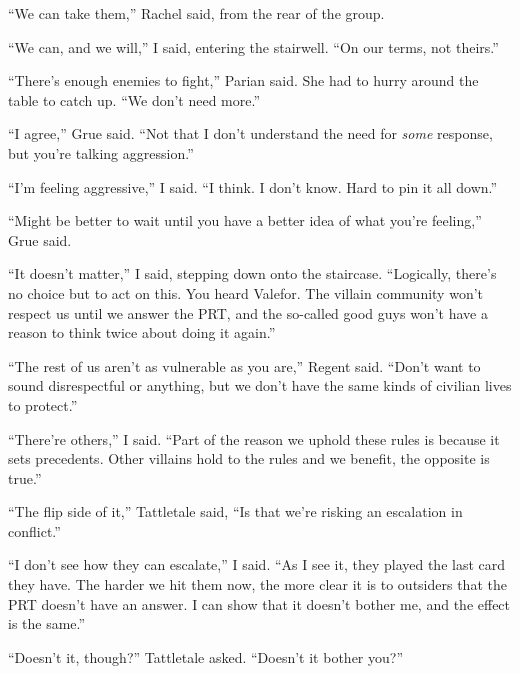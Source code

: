 ``We can take them,'' Rachel said, from the rear of the group.



``We can, and we will,'' I said, entering the stairwell.  ``On our terms, not theirs.''



``There's enough enemies to fight,'' Parian said.  She had to hurry around the table to catch up.  ``We don't need more.''



``I agree,'' Grue said.  ``Not that I don't understand the need for \emph{some }response, but you're talking aggression.''



``I'm feeling aggressive,'' I said.  ``I think.  I don't know.  Hard to pin it all down.''



``Might be better to wait until you have a better idea of what you're feeling,'' Grue said.



``It doesn't matter,'' I said, stepping down onto the staircase.  ``Logically, there's no choice but to act on this.  You heard Valefor.  The villain community won't respect us until we answer the PRT, and the so-called good guys won't have a reason to think twice about doing it again.''



``The rest of us aren't as vulnerable as you are,'' Regent said.  ``Don't want to sound disrespectful or anything, but we don't have the same kinds of civilian lives to protect.''



``There're others,'' I said.  ``Part of the reason we uphold these rules is because it sets precedents.  Other villains hold to the rules and we benefit, the opposite is true.''



``The flip side of it,'' Tattletale said, ``Is that we're risking an escalation in conflict.''



``I don't see how they can escalate,'' I said.  ``As I see it, they played the last card they have.  The harder we hit them now, the more clear it is to outsiders that the PRT doesn't have an answer.  I can show that it doesn't bother me, and the effect is the same.''



``Doesn't it, though?'' Tattletale asked.  ``Doesn't it bother you?''



